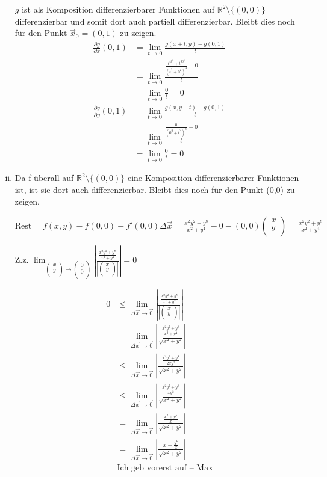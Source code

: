 \documentclass[10pt,a4paper,parskip=half]{scrartcl}
\newcommand{\R}{\mathbb{R}}
\newcommand{\vectwo}[2]{\left(\begin {array} {c} #1 \\ #2 \\ \end {array} \right)}
\begin{document}
\begin{enumerate}[(i)]
$g$ ist als Komposition differenzierbarer Funktionen auf $\R^2\setminus{\{(0,0)\}}$ differenzierbar und somit dort auch partiell differenzierbar. Bleibt dies noch für den Punkt $\vec x_0 = (0,1)$ zu zeigen.
\begin{align*}
\frac{\partial g}{\partial x} (0,1)&= \lim_{t \to 0} \frac{g(x+t,y)-g(0,1)}{t}\\
&= \lim_{t \to 0} \frac{\frac{t^40^2+t^30^3}{(t^2+0^2)^3} - 0}{t}\\
&= \lim_{t \to 0} \frac{0}{t} = 0
\end{align*}
\begin{align*}
\frac{\partial g}{\partial y} (0,1)&= \lim_{t \to 0} \frac{g(x,y+t)-g(0,1)}{t}\\
&= \lim_{t \to 0} \frac{\frac{0}{(0^2+t^2)^3} - 0}{t}\\
&= \lim_{t \to 0} \frac{0}{t} = 0
\end{align*}

\item
Da f überall auf $\mathbb R^2\setminus{\{(0,0)\}}$ eine Komposition differenzierbarer Funktionen ist, ist sie dort auch differenzierbar. Bleibt dies noch für den Punkt (0,0) zu zeigen.

$\text{Rest} = f(x,y) - f(0,0) - f'(0,0) \Delta \vec x = \frac{x^2y^2+y^8}{x^2 + y^4} - 0 - (0,0) \vectwo{x}{y} = \frac{x^2y^2+y^8}{x^2 + y^4}$

Z.z. $\lim_{\vectwo{x}{y} \to \vectwo{0}{0}} \left|\frac{\frac{x^2y^2+y^8}{x^2 + y^4}}{\left|\vectwo{x}{y}\right|}\right| = 0$

\begin{align*}
0 &\le \lim_{\Delta \vec x \to \vec 0} \left|\frac{\frac{x^2y^2+y^8}{x^2 + y^4}}{\left|\vectwo{x}{y}\right|}\right|\\
&= \lim_{\Delta \vec x \to \vec 0} \left|\frac{\frac{x^2y^2+y^8}{x^2 + y^4}}{\sqrt{x^2+y^2}}\right| \\
&\le \lim_{\Delta \vec x \to \vec 0} \left|\frac{\frac{x^2y^2+y^8}{2xy^2}}{\sqrt{x^2+y^2}}\right| \\
&\le \lim_{\Delta \vec x \to \vec 0} \left|\frac{\frac{x^2y^2+y^8}{xy^2}}{\sqrt{x^2+y^2}}\right| \\
&= \lim_{\Delta \vec x \to \vec 0} \left|\frac{\frac{x^2+y^6}{x}}{\sqrt{x^2+y^2}}\right| \\
&= \lim_{\Delta \vec x \to \vec 0} \left|\frac{x+\frac{y^6}{x}}{\sqrt{x^2+y^2}}\right| \\
& \text{Ich geb vorerst auf -- Max}
\end{align*}


\end{enumerate}
\end{document}
